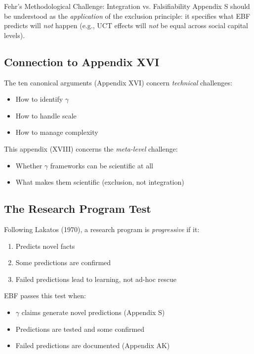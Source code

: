 \begin{chapter}{Fehr's Methodological Challenge: Integration vs. Falsifiability}
Appendix S should be understood as the \textit{application} of the exclusion principle: it specifies what EBF predicts will \textit{not} happen (e.g., UCT effects will \textit{not} be equal across social capital levels).

\subsection{Connection to Appendix XVI}

The ten canonical arguments (Appendix XVI) concern \textit{technical} challenges:
\begin{itemize}[noitemsep]
    \item How to identify $\gamma$
    \item How to handle scale
    \item How to manage complexity
\end{itemize}

This appendix (XVIII) concerns the \textit{meta-level} challenge:
\begin{itemize}[noitemsep]
    \item Whether $\gamma$ frameworks can be scientific at all
    \item What makes them scientific (exclusion, not integration)
\end{itemize}

\subsection{The Research Program Test}

Following Lakatos (1970), a research program is \textit{progressive} if it:
\begin{enumerate}
    \item Predicts novel facts
    \item Some predictions are confirmed
    \item Failed predictions lead to learning, not ad-hoc rescue
\end{enumerate}

EBF passes this test when:
\begin{itemize}[noitemsep]
    \item $\gamma$ claims generate novel predictions (Appendix S)
    \item Predictions are tested and some confirmed
    \item Failed predictions are documented (Appendix AK)
\end{itemize}


\end{chapter}
